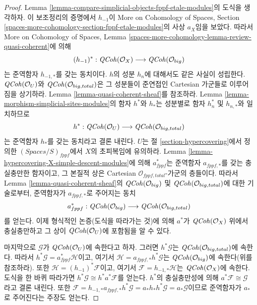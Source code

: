 \begin{proof}
Lemma \ref{lemma-compare-simplicial-objects-fppf-etale-modules}의
도식을 생각하자. 이 보조정리의 증명에서 $h_{-1}$이
More on Cohomology of Spaces, Section
\ref{spaces-more-cohomology-section-fppf-etale-modules}의
사상 $a_X$임을 보았다. 따라서 More on Cohomology of Spaces, Lemma
\ref{spaces-more-cohomology-lemma-review-quasi-coherent}에 의해
$$
(h_{-1})^* :
\mathit{QCoh}(\mathcal{O}_X)
\longrightarrow
\mathit{QCoh}(\mathcal{O}_{big})
$$
는 준역함자 $h_{-1, *}$를 갖는 동치이다.
$h$의 성분 $h_n$에 대해서도 같은 사실이 성립한다.
$\mathit{QCoh}(\mathcal{O}_U)$와 $\mathit{QCoh}(\mathcal{O}_{big, total})$은
그 성분들이 준연접인 Cartesian 가군들로 이루어짐을 상기하라.
Lemma \ref{lemma-quasi-coherent-sheaf}를 참조하라.
Lemma \ref{lemma-morphism-simplicial-sites-modules}의 함자
$h^*$와 $h_*$는 성분별로 함자 $h_n^*$ 및 $h_{n, *}$와 일치하므로
$$
h^* :
\mathit{QCoh}(\mathcal{O}_U)
\longrightarrow 
\mathit{QCoh}(\mathcal{O}_{big, total})
$$
는 준역함자 $h_*$를 갖는 동치라고 결론 내린다.
$U$는 절 \ref{section-hypercovering}에서 정의한
$(\textit{Spaces}/S)_{fppf}$에서 $X$의 초피복임에 유의하라.
Lemma \ref{lemma-hypercovering-X-simple-descent-modules}에 의해
$a_{fppf}^*$는 준역함자 $a_{fppf, *}$를 갖는 충실충만한 함자이고,
그 본질적 상은 Cartesian
$\mathcal{O}_{fppf, total}$-가군의 층들이다.
따라서 Lemma \ref{lemma-quasi-coherent-sheaf}의
$\mathit{QCoh}(\mathcal{O}_{big})$ 및
$\mathit{QCoh}(\mathcal{O}_{big, total})$에 대한 기술로부터,
준역함자가 $a_{fppf, *}$로 주어지는 동치
$$
a_{fppf}^* :
\mathit{QCoh}(\mathcal{O}_{big})
\longrightarrow
\mathit{QCoh}(\mathcal{O}_{big, total})
$$
를 얻는다. 이제 형식적인 논증(도식을 따라가는 것)에 의해
$a^*$가 $\mathit{QCoh}(\mathcal{O}_X)$ 위에서 충실충만하고
그 상이 $\mathit{QCoh}(\mathcal{O}_U)$에 포함됨을 알 수 있다.

\medskip\noindent
마지막으로 $\mathcal{G}$가 $\mathit{QCoh}(\mathcal{O}_U)$에 속한다고 하자.
그러면 $h^*\mathcal{G}$는\newline
$\mathit{QCoh}(\mathcal{O}_{big, total})$에 속한다.
따라서 $h^*\mathcal{G} = a_{fppf}^*\mathcal{H}$이고, 여기서\newline
$\mathcal{H} = a_{fppf, *}h^*\mathcal{G}$는
$\mathit{QCoh}(\mathcal{O}_{big})$에 속한다(위를 참조하라).
또한 $\mathcal{H} = (h_{-1})^*\mathcal{F}$이고, 여기서
$\mathcal{F} = h_{-1, *}\mathcal{H}$는
$\mathit{QCoh}(\mathcal{O}_X)$에 속한다. 도식을 한 바퀴 따라가면
$h^*\mathcal{G} \cong h^*a^*\mathcal{F}$를 얻는다.
$h^*$의 충실충만성에 의해
$a^*\mathcal{F} \cong \mathcal{G}$라고 결론 내린다.
또한
$\mathcal{F} = h_{-1, *}a_{fppf, *}h^*\mathcal{G} =
a_*h_*h^*\mathcal{G} = a_*\mathcal{G}$이므로
준역함자가 $a_*$로 주어진다는 주장도 얻는다.
\end{proof}

